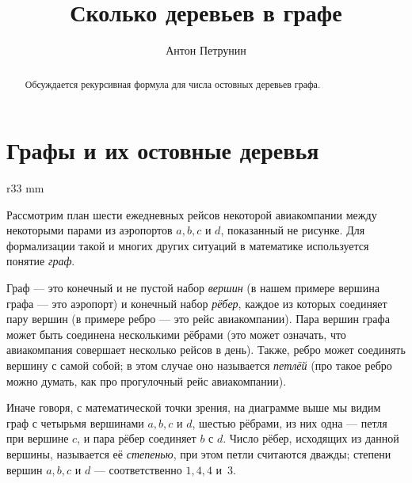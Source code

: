 \documentclass{article}
\begin{document}
\title{Сколько деревьев в графе}
\author{Антон Петрунин}
\date{}
\maketitle

\begin{abstract}
Обсуждается рекурсивная формула для числа остовных деревьев графа.
\end{abstract}



\section{Графы и их остовные деревья}

\begin{wrapfigure}{r}{33 mm}
\vskip-4mm
\end{wrapfigure}

Рассмотрим план шести ежедневных рейсов некоторой авиакомпании между некоторыми парами из аэропортов $a,b,c$ и $d$,
показанный не рисунке.
Для формализации такой и многих других ситуаций в математике используется понятие \emph{граф}.

Граф --- это конечный и не пустой набор \emph{вершин} (в нашем примере вершина графа --- это аэропорт) 
и конечный набор \emph{рёбер}, каждое из которых соединяет пару вершин (в примере ребро --- это рейс авиакомпании).
Пара вершин графа может быть соединена несколькими рёбрами (это может означать, что авиакомпания совершает несколько рейсов в день). 
Также, ребро может соединять вершину с самой собой; в этом случае оно называется \emph{петлёй} (про такое ребро можно думать, как про прогулочный рейс авиакомпании).

Иначе говоря, с математической точки зрения, на диаграмме выше мы видим граф с четырьмя вершинами $a,b,c$ и $d$, 
шестью рёбрами, из них
одна --- петля при вершине $c$, и пара рёбер соединяет $b$ с $d$.
Число рёбер, исходящих из данной вершины, называется её \emph{степенью}, при этом петли считаются дважды;
степени вершин $a,b,c$ и $d$ --- соответственно $1,4,4$ и~$3$.
\end{document}
